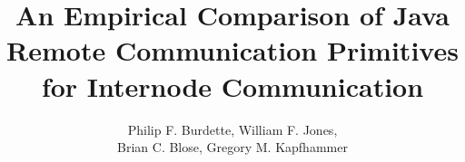 \documentclass{sig-alternate}
\begin{document}



\title{An Empirical Comparison of Java Remote Communication Primitives
  for Internode Communication}


\author{
\alignauthor Philip F. Burdette, William F. Jones, \\
 Brian C. Blose, Gregory M. Kapfhammer \\
       \\
        \\ 
}
\maketitle
\end{document}
